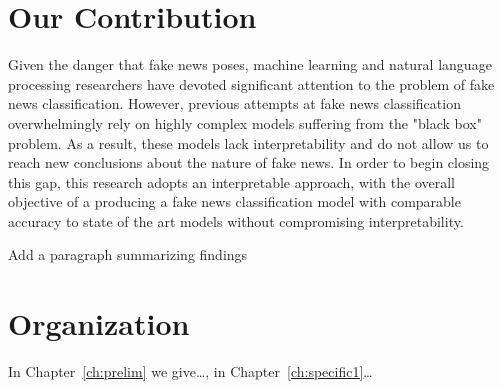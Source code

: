\documentclass[../thesis.tex]{subfiles}
\begin{document}
\section{Our Contribution}
Given the danger that fake news poses, machine learning and natural language processing researchers have devoted significant attention to the problem of fake news classification. However, previous attempts at fake news classification overwhelmingly rely on highly complex models suffering from the "black box" problem. As a result, these models lack interpretability and do not allow us to reach new conclusions about the nature of fake news. In order to begin closing this gap, this research adopts an interpretable approach, with the overall objective of a producing a fake news classification model with comparable accuracy to state of the art models without compromising interpretability.

Add a paragraph summarizing findings

\section{Organization}
In Chapter~\ref{ch:prelim} we give\ldots, in Chapter~\ref{ch:specific1}\ldots
\end{document}
